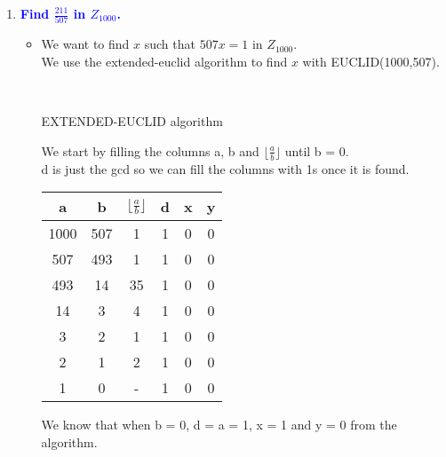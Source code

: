 \documentclass[11pt]{article}
\begin{document}
\begin{enumerate}
\item \textbf{\textcolor{blue}{Find $\frac{211}{507}$ in $Z_{1000}$.}}
    \begin{itemize}
        \item We want to find $x$ such that $507x = 1$ in $Z_{1000}$.
            \\ We use the extended-euclid algorithm to find $x$ with EUCLID(1000,507). \\
            \begin{algorithm}[H]
            \Indm{}\\
            \Indp
            \caption{EXTENDED-EUCLID algorithm}
            \end{algorithm}
            We start by filling the columns a, b and ${\lfloor}\frac{a}{b}{\rfloor}$ until b = 0.
            \\ d is just the gcd so we can fill the columns with 1s once it is found. \\
            \begin{center}
            \begin{tabular}{| c | c | c | c | c | c |} 
            \hline
            a & b & ${\lfloor}\frac{a}{b}{\rfloor}$ & d & x & y \\
            \hline
            1000 & 507 & 1 & 1 & 0 & 0 \\
            507 & 493 & 1 & 1 & 0 & 0 \\
            493 & 14 & 35 & 1 & 0 & 0 \\
            14 & 3 & 4 & 1 & 0 & 0 \\
            3 & 2 & 1 & 1 & 0 & 0 \\
            2 & 1 & 2 & 1 & 0 & 0 \\
            1 & 0 & - & 1 & 0 & 0 \\
            \hline
            \end{tabular}
            \end{center}
            We know that when b = 0, d = a = 1, x = 1 and y = 0 from the algorithm. \\

\end{itemize}
\end{enumerate}
\end{document}
